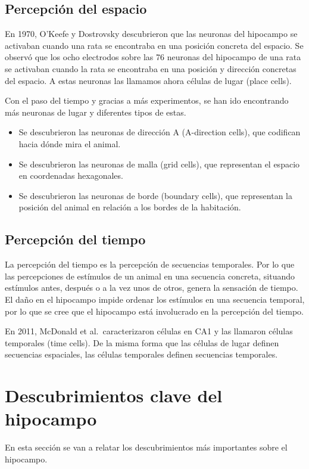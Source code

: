 \documentclass[12pt, letterpaper]{article}
\begin{document}
\subsection{Percepción del espacio}
En 1970, O'Keefe y Dostrovsky descubrieron que las neuronas del hipocampo se activaban cuando una rata se encontraba en una posición concreta del espacio. Se observó que los ocho electrodos sobre las 76 neuronas del hipocampo de una rata se activaban cuando la rata se encontraba en una posición y dirección concretas del espacio. A estas neuronas las llamamos ahora células de lugar (place cells). 

Con el paso del tiempo y gracias a más experimentos, se han ido encontrando más neuronas de lugar y diferentes tipos de estas. 
\begin{itemize}
    \item Se descubrieron las neuronas de dirección A (A-direction cells), que codifican hacia dónde mira el animal.
    \item Se descubrieron las neuronas de malla (grid cells), que representan el espacio en coordenadas hexagonales.
    \item Se descubrieron las neuronas de borde (boundary cells), que representan la posición del animal en relación a los bordes de la habitación.
\end{itemize}

\subsection{Percepción del tiempo}
La percepción del tiempo es la percepción de secuencias temporales. Por lo que las percepciones de estímulos de un animal en una secuencia concreta, situando estímulos antes, después o a la vez unos de otros, genera la sensación de tiempo. El daño en el hipocampo impide ordenar los estímulos en una secuencia temporal, por lo que se cree que el hipocampo está involucrado en la percepción del tiempo.

En 2011, McDonald et al.\ caracterizaron células en CA1 y las llamaron células temporales (time cells). De la misma forma que las células de lugar definen secuencias espaciales, las células temporales definen secuencias temporales.

\section{Descubrimientos clave del hipocampo}
En esta sección se van a relatar los descubrimientos más importantes sobre el hipocampo.
\end{document}
